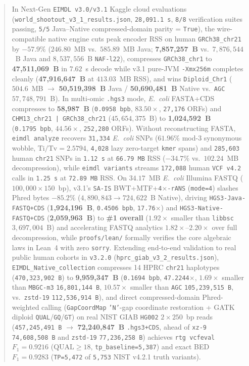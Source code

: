 \documentclass[10pt]{article}
\theoremstyle{definition}
\begin{document}
\begin{abstract}
In Next-Gen \texttt{EIMDL v3.0/v3.1} Kaggle cloud evaluations (\texttt{world\_shootout\_v3\_1\_results.json}, \texttt{28,091.1~s}, \texttt{8/8} verification suites passing, \texttt{5/5} Java--Native compressed-domain parity = \texttt{True}), the wire-compatible native engine cuts peak encoder RSS on human \texttt{GRCh38\_chr21} by \textbf{$-57.9\%$} ($246.80$~MB vs.\ $585.89$~MB Java; \textbf{7,857,257~B} vs.\ $7,876,544$~B Java and $8,537,556$~B \texttt{NAF-l22}), compresses \texttt{GRCh38\_chr1} to \textbf{47,511,069~B} in $7.62$~s decode while v3.1 pure-JVM \texttt{-Xmx256m} completes cleanly (\textbf{47,916,647~B} at $413.03$~MB RSS), and wins \texttt{Diploid\_Chr1} ($504.6$~MB $\to$ \textbf{50,519,398~B} Java / \textbf{50,690,481~B} Native vs.\ \texttt{AGC} $57,748,791$~B). In multi-omic \texttt{.hgs3} mode, \textit{E.~coli} FASTA+CDS compresses to \textbf{58,987~B} (\texttt{0.0958~bpb}, $83.50\times$, \texttt{27,176} ORFs) and \texttt{CHM13\_chr21 | GRCh38\_chr21} ($45,654,375$~B) to \textbf{1,024,592~B} (\texttt{0.1795~bpb}, $44.56\times$, \texttt{252,280} ORFs). Without reconstructing FASTA, \texttt{eimdl analyze} recovers \texttt{31,334} \textit{E.~coli} SNPs ($61.96\%$ mod-3 synonymous wobble, $\text{Ti/Tv}=2.5794$, \texttt{4,028} lazy zero-target \texttt{kmer} spans) and \texttt{285,603} human \texttt{chr21} SNPs in \texttt{1.12~s} at \texttt{66.79~MB} RSS ($-34.7\%$ vs.\ $102.24$~MB decompression), while \texttt{eimdl variants} streams \texttt{172,088} human \texttt{VCF v4.2} calls in \texttt{1.25~s} at \texttt{72.89~MB} RSS. On $34.17$~MB \textit{E.~coli} Illumina FASTQ ($100{,}000\times 150$~bp), v3.1's \texttt{SA-IS} BWT+MTF+\texttt{4$\times$-rANS} (\texttt{mode=4}) slashes Phred bytes $-85.2\%$ ($4,890,843 \to 724,622$~B Native), driving \texttt{HGS3-Java-FASTQ+CDS} (\textbf{1,924,196~B}, \texttt{0.4506~bpb}, \texttt{17.76$\times$}) and \texttt{HGS3-Native-FASTQ+CDS} (\textbf{2,059,963~B}) to \textbf{\#1 overall} ($1.92\times$ smaller than \texttt{libbsc} $3,697,004$~B) and accelerating FASTQ analytics $1.82\times\text{--}2.20\times$ over full decompression, while \texttt{proofs/lean/} formally verifies the core algebraic laws in Lean~4 with zero \texttt{sorry}. Extending end-to-end validation to real public human cohorts in \texttt{v3.2.0} (\texttt{hprc\_giab\_v3\_2\_results.json}), \texttt{EIMDL\_Native\_collection} compresses 14 HPRC \texttt{chr21} haplotypes (\texttt{470,323,902~B}) to \textbf{9,959,347~B} (\texttt{0.1694~bpb}, \texttt{47.2244$\times$}, $1.69\times$ smaller than \texttt{MBGC-m3} \texttt{16,801,144~B}, $10.57\times$ smaller than \texttt{AGC} \texttt{105,239,515~B}, vs.\ \texttt{zstd-19} \texttt{112,536,914~B}), and direct compressed-domain Phred-weighted calling (\texttt{GapCoordMap} \texttt{'N'}-gap coordinate restoration + GATK diploid \texttt{QUAL}/\texttt{GQ}/\texttt{GT}) on real NIST GIAB \texttt{HG002} $2\times 250$~bp reads (\texttt{457,245,491~B} $\to$ \textbf{72,240,847~B} \texttt{.hgs3+CDS}, ahead of \texttt{xz-9} \texttt{74,608,508~B} and \texttt{zstd-19} \texttt{77,236,258~B}) achieves \texttt{rtg vcfeval} \textbf{$F_1=0.9216$} ($\text{QUAL}\ge 18$, \texttt{tp\_baseline=5,387}) and exact BED \textbf{$F_1=0.9283$} (\texttt{TP=5,472} of \texttt{5,753} NIST v4.2.1 truth variants).
\end{abstract}
\end{document}

